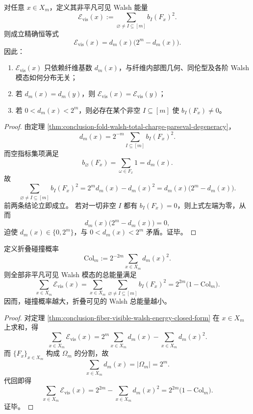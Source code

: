 \begin{theorem}\label{thm:conclusion-fiber-visible-walsh-energy-closed-form}
对任意 \(x\in X_m\)，定义其非平凡可见 Walsh 能量
\[
\mathcal E_{\mathrm{vis}}(x):=\sum_{\varnothing\neq I\subseteq[m]} b_I(F_x)^2.
\]
则成立精确恒等式
\[
\mathcal E_{\mathrm{vis}}(x)=d_m(x)\bigl(2^m-d_m(x)\bigr).
\]
因此：
\begin{enumerate}
  \item \(\mathcal E_{\mathrm{vis}}(x)\) 只依赖纤维基数 \(d_m(x)\)，与纤维内部图几何、同伦型及各阶 Walsh 模态如何分布无关；
  \item 若 \(d_m(x)=d_m(y)\)，则 \(\mathcal E_{\mathrm{vis}}(x)=\mathcal E_{\mathrm{vis}}(y)\)；
  \item 若 \(0<d_m(x)<2^m\)，则必存在某个非空 \(I\subseteq[m]\) 使 \(b_I(F_x)\neq 0\)。
\end{enumerate}
\end{theorem}

\begin{proof}
由定理 \ref{thm:conclusion-fold-walsh-total-charge-parseval-degeneracy}，
\[
d_m(x)=2^{-m}\sum_{I\subseteq[m]}b_I(F_x)^2.
\]
而空指标集项满足
\[
b_{\varnothing}(F_x)=\sum_{\omega\in F_x}1=d_m(x).
\]
故
\[
\sum_{\varnothing\neq I\subseteq[m]}b_I(F_x)^2
=
2^m d_m(x)-d_m(x)^2
=
d_m(x)\bigl(2^m-d_m(x)\bigr).
\]
前两条结论立即成立。
若对一切非空 \(I\) 都有 \(b_I(F_x)=0\)，则上式左端为零，从而
\[
d_m(x)\bigl(2^m-d_m(x)\bigr)=0,
\]
迫使 \(d_m(x)\in\{0,2^m\}\)，与 \(0<d_m(x)<2^m\) 矛盾。证毕。
\end{proof}

\begin{theorem}\label{thm:conclusion-global-visible-walsh-energy-collision-deficit}
定义折叠碰撞概率
\[
\mathrm{Col}_m:=2^{-2m}\sum_{x\in X_m}d_m(x)^2.
\]
则全部非平凡可见 Walsh 模态的总能量满足
\[
\sum_{x\in X_m}\mathcal E_{\mathrm{vis}}(x)
=
\sum_{x\in X_m}\sum_{\varnothing\neq I\subseteq[m]} b_I(F_x)^2
=
2^{2m}\bigl(1-\mathrm{Col}_m\bigr).
\]
因而，碰撞概率越大，折叠可见的 Walsh 总能量越小。
\end{theorem}

\begin{proof}
对定理 \ref{thm:conclusion-fiber-visible-walsh-energy-closed-form} 在 \(x\in X_m\) 上求和，得
\[
\sum_{x\in X_m}\mathcal E_{\mathrm{vis}}(x)
=
2^m\sum_{x\in X_m}d_m(x)-\sum_{x\in X_m}d_m(x)^2.
\]
而 \(\{F_x\}_{x\in X_m}\) 构成 \(\Omega_m\) 的分割，故
\[
\sum_{x\in X_m}d_m(x)=|\Omega_m|=2^m.
\]
代回即得
\[
\sum_{x\in X_m}\mathcal E_{\mathrm{vis}}(x)
=
2^{2m}-\sum_{x\in X_m}d_m(x)^2
=
2^{2m}\bigl(1-\mathrm{Col}_m\bigr).
\]
证毕。
\end{proof}

